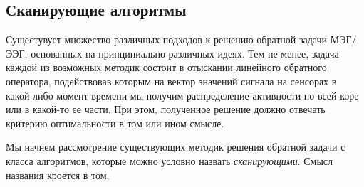\subsection{Сканирующие алгоритмы} \label{sect_dics}
Сущестувует множество различных подходов к решению обратной задачи МЭГ/ЭЭГ, основанных
на принципиально различных идеях.
Тем не менее, задача каждой из возможных методик состоит в отыскании
линейного обратного оператора, подействовав которым на вектор значений сигнала на сенсорах
в какой-либо момент времени мы получим распределение активности по всей коре или в какой-то ее части.
При этом, полученное решение должно отвечать критерию оптимальности в том или ином смысле.

Мы начнем рассмотрение существующих методик решения обратной задачи с класса алгоритмов, которые
можно условно назвать \emph{сканирующими}. Смысл названия кроется в том,

